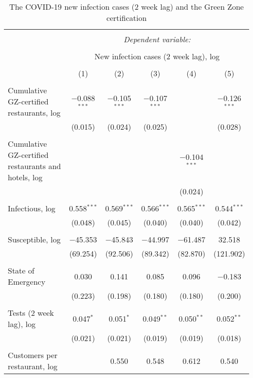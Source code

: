
\begin{table}[!htbp] \centering 
  \caption{The COVID-19 new infection cases (2 week lag) and the Green Zone certification} 
  \label{} 
\scriptsize 
\begin{tabular}{@{\extracolsep{1pt}}lccccc} 
\\[-1.8ex]\hline 
\hline \\[-1.8ex] 
 & \multicolumn{5}{c}{\textit{Dependent variable:}} \\ 
\cline{2-6} 
\\[-1.8ex] & \multicolumn{5}{c}{New infection cases (2 week lag), log} \\ 
\\[-1.8ex] & (1) & (2) & (3) & (4) & (5)\\ 
\hline \\[-1.8ex] 
 Cumulative GZ-certified restaurants, log & $-$0.088$^{***}$ & $-$0.105$^{***}$ & $-$0.107$^{***}$ &  & $-$0.126$^{***}$ \\ 
  & (0.015) & (0.024) & (0.025) &  & (0.028) \\ 
  & & & & & \\ 
 Cumulative GZ-certified restaurants and hotels, log &  &  &  & $-$0.104$^{***}$ &  \\ 
  &  &  &  & (0.024) &  \\ 
  & & & & & \\ 
 Infectious, log & 0.558$^{***}$ & 0.569$^{***}$ & 0.566$^{***}$ & 0.565$^{***}$ & 0.544$^{***}$ \\ 
  & (0.048) & (0.045) & (0.040) & (0.040) & (0.042) \\ 
  & & & & & \\ 
 Susceptible, log & $-$45.353 & $-$45.843 & $-$44.997 & $-$61.487 & 32.518 \\ 
  & (69.254) & (92.506) & (89.342) & (82.870) & (121.902) \\ 
  & & & & & \\ 
 State of Emergency & 0.030 & 0.141 & 0.085 & 0.096 & $-$0.183 \\ 
  & (0.223) & (0.198) & (0.180) & (0.180) & (0.200) \\ 
  & & & & & \\ 
 Tests (2 week lag), log & 0.047$^{*}$ & 0.051$^{*}$ & 0.049$^{**}$ & 0.050$^{**}$ & 0.052$^{**}$ \\ 
  & (0.021) & (0.021) & (0.019) & (0.019) & (0.018) \\ 
  & & & & & \\ 
 Customers per restaurant, log &  & 0.550 & 0.548 & 0.612 & 0.540 \\ 

\end{tabular}
\end{table}

